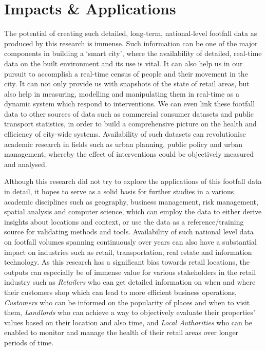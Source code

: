 \section{Impacts \& Applications}
The potential of creating such detailed, long-term, national-level footfall data as produced by this research is immense.
Such information can be one of the major components in building a `smart city', where the availability of detailed, real-time data on the built environment and its use is vital.
It can also help us in our pursuit to accomplish a real-time census of people and their movement in the city.
It can not only provide us with snapshots of the state of  retail areas, but also help in measuring, modelling and manipulating them in real-time as a dynamic system which respond to interventions.
We can even link these footfall data to other sources of data such as commercial consumer datasets and public transport statistics, in order to build a comprehensive picture on the health and efficiency of city-wide systems.
Availability of such datasets can revolutionise academic research in fields such as urban planning, public policy and urban management, whereby the effect of interventions could be objectively measured and analysed.

Although this research did not try to explore the applications of this footfall data in detail, it hopes to serve as a solid basis for further studies in a various academic disciplines such as geography, business management, risk management, spatial analysis and computer science, which can employ the data to either derive insights about locations and context, or use the data as a reference/training source for validating methods and tools.
Availability of such national level data on footfall volumes spanning continuously over years can also have a substantial impact on industries such as retail, transportation, real estate and information technology.
As this research has a significant bias towards retail locations, the outputs can especially be of immense value for various stakeholders in the retail industry such as \textit{Retailers} who can get detailed information on when and where their customers shop which can lead to more efficient business operations, \textit{Customers} who can be informed on the popularity of places and when to visit them, \textit{Landlords} who can achieve a way to objectively evaluate their properties' values based on their location and also time, and \textit{Local Authorities} who can be enabled to monitor and manage the health of their retail areas over longer periods of time.

